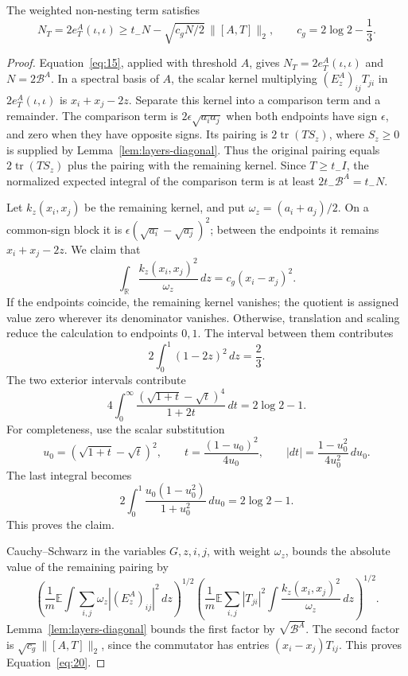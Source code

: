 \begin{lemma}\label{lem:layers-constant}
The weighted non-nesting term satisfies
\begin{equation}
 N_T=2e_T^A(\iota,\iota)
 \ge t_-N-\sqrt{c_gN/2}\,\|[A,T]\|_2,
 \qquad c_g=2\log2-\frac13.
 \tag{20}\label{eq:20}
\end{equation}
\end{lemma}

\begin{proof}
Equation~\eqref{eq:15}, applied with threshold \(A\), gives
\(N_T=2e_T^A(\iota,\iota)\) and \(N=2\mathcal B^A\).
In a spectral basis of \(A\), the scalar kernel multiplying
\((E_z^A)_{ij}T_{ji}\) in \(2e_T^A(\iota,\iota)\) is
\(x_i+x_j-2z\).
Separate this kernel into a comparison term and a remainder. The
comparison term is \(2\epsilon\sqrt{a_i a_j}\) when both endpoints
have sign \(\epsilon\), and zero when they have opposite signs.
Its pairing is \(2\operatorname{tr}(TS_z)\), where \(S_z\ge0\)
is supplied by Lemma~\ref{lem:layers-diagonal}. Thus the original
pairing equals \(2\operatorname{tr}(TS_z)\) plus the pairing with
the remaining kernel. Since \(T\ge t_-I\), the normalized expected
integral of the comparison term is at least
\(2t_-\mathcal B^A=t_-N\).

Let \(k_z(x_i,x_j)\) be the remaining kernel, and put
\(\omega_z=(a_i+a_j)/2\).
On a common-sign block it is
\(\epsilon(\sqrt{a_i}-\sqrt{a_j})^2\);
between the endpoints it remains \(x_i+x_j-2z\).
We claim that
\[
 \int_{\mathbb R}\frac{k_z(x_i,x_j)^2}{\omega_z}\,dz
 =c_g(x_i-x_j)^2.
\]
If the endpoints coincide, the remaining kernel vanishes;
the quotient is assigned value zero wherever its denominator
vanishes.  Otherwise, translation and scaling reduce the
calculation to endpoints \(0,1\).
The interval between them contributes
\[
 2\int_0^1(1-2z)^2\,dz=\frac23.
\]
The two exterior intervals contribute
\[
 4\int_0^\infty
       \frac{(\sqrt{1+t}-\sqrt t)^4}{1+2t}\,dt=2\log2-1.
\]
For completeness, use the scalar substitution
\[
 u_0=(\sqrt{1+t}-\sqrt t)^2,\qquad
 t=\frac{(1-u_0)^2}{4u_0},\qquad
 |dt|=\frac{1-u_0^2}{4u_0^2}\,du_0.
\]
The last integral becomes
\[
 2\int_0^1\frac{u_0(1-u_0^2)}{1+u_0^2}\,du_0
 =2\log2-1.
\]
This proves the claim.

Cauchy--Schwarz in the variables \(G,z,i,j\), with weight
\(\omega_z\), bounds the absolute value of the remaining pairing by
\[
 \left(\frac1m\mathbb E\int
          \sum_{i,j}\omega_z|(E_z^A)_{ij}|^2\,dz\right)^{1/2}
 \left(\frac1m\mathbb E\sum_{i,j}|T_{ji}|^2
          \int\frac{k_z(x_i,x_j)^2}{\omega_z}\,dz\right)^{1/2}.
\]
Lemma~\ref{lem:layers-diagonal} bounds the first factor by
\(\sqrt{\mathcal B^A}\).
The second factor is \(\sqrt{c_g}\|[A,T]\|_2\), since
the commutator has entries \((x_i-x_j)T_{ij}\).
This proves Equation~\eqref{eq:20}.
\end{proof}

